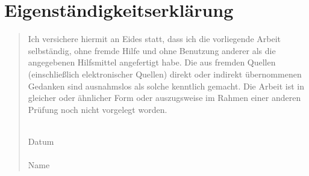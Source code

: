 \chapter*{Eigenständigkeitserklärung}
\begin{quote}

\vspace*{3cm}

Ich versichere hiermit an Eides statt, dass ich die vorliegende Arbeit selbständig, ohne fremde Hilfe und ohne Benutzung anderer als die angegebenen Hilfsmittel angefertigt habe. Die aus fremden Quellen (einschließlich elektronischer Quellen) direkt oder indirekt übernommenen Gedanken sind ausnahmslos als solche kenntlich gemacht. Die Arbeit ist in gleicher oder ähnlicher Form oder auszugsweise im Rahmen einer anderen Prüfung noch nicht vorgelegt worden.

\vspace*{2cm}

\begin{flushright}
\underline{\hspace{4cm}}\\
Datum\\
\vspace*{1cm}
\underline{\hspace{4cm}}\\
Name
\end{flushright}

\end{quote}

